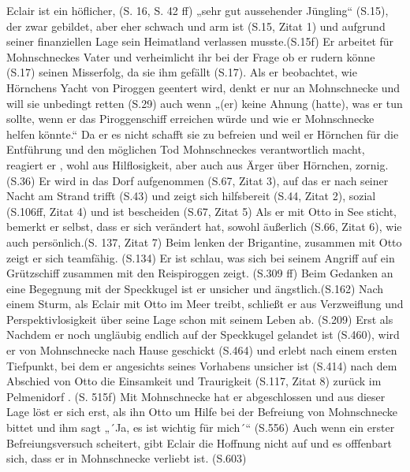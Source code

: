Eclair ist ein höflicher, (S. 16, S. 42 ff) „sehr gut aussehender Jüngling“ (S.15), der zwar gebildet, aber eher schwach und arm ist (S.15, Zitat 1) und aufgrund seiner finanziellen Lage sein Heimatland verlassen musste.(S.15f) Er arbeitet für Mohnschneckes Vater und verheimlicht ihr bei der Frage ob er rudern könne (S.17) seinen Misserfolg, da sie ihm gefällt (S.17). Als er beobachtet, wie Hörnchens Yacht von Piroggen geentert wird, denkt er nur an Mohnschnecke und will sie unbedingt retten (S.29) auch wenn „(er) keine Ahnung (hatte), was er tun sollte, wenn er das Piroggenschiff erreichen würde und wie er Mohnschnecke helfen könnte.“ Da er es nicht schafft sie zu befreien und weil er Hörnchen für die Entführung und den möglichen Tod Mohnschneckes verantwortlich macht, reagiert er , wohl aus Hilflosigkeit, aber auch aus Ärger über Hörnchen, zornig. (S.36) Er wird in das Dorf aufgenommen (S.67, Zitat 3), auf das er nach seiner Nacht am Strand trifft (S.43) und zeigt sich hilfsbereit (S.44, Zitat 2), sozial (S.106ff, Zitat 4) und ist bescheiden (S.67, Zitat 5) Als er mit Otto in See sticht, bemerkt er selbst, dass er sich verändert hat, sowohl äußerlich (S.66, Zitat 6), wie auch persönlich.(S. 137, Zitat 7) Beim lenken der Brigantine, zusammen mit Otto zeigt er sich teamfähig. (S.134) Er ist schlau, was sich bei seinem Angriff auf ein Grützschiff zusammen mit den Reispiroggen zeigt. (S.309 ff) Beim Gedanken an eine Begegnung mit der Speckkugel ist er  unsicher und ängstlich.(S.162) Nach einem Sturm, als Eclair mit Otto im Meer treibt, schließt er aus Verzweiflung und Perspektivlosigkeit über seine Lage schon mit seinem Leben ab. (S.209) Erst als Nachdem er noch ungläubig endlich auf der Speckkugel gelandet ist (S.460), wird er von Mohnschnecke nach Hause geschickt (S.464) und erlebt  nach einem ersten Tiefpunkt, bei dem er angesichts seines Vorhabens unsicher ist (S.414) nach dem Abschied von Otto die Einsamkeit und Traurigkeit (S.117, Zitat 8) zurück im Pelmenidorf . (S. 515f) Mit Mohnschnecke hat er abgeschlossen und aus dieser Lage löst er sich erst, als ihn Otto um Hilfe bei der Befreiung von Mohnschnecke bittet und ihm sagt „´Ja, es ist wichtig für mich´“ (S.556) Auch wenn ein erster Befreiungsversuch scheitert, gibt Eclair die Hoffnung nicht auf und es offfenbart sich, dass er in Mohnschnecke verliebt ist. (S.603)

